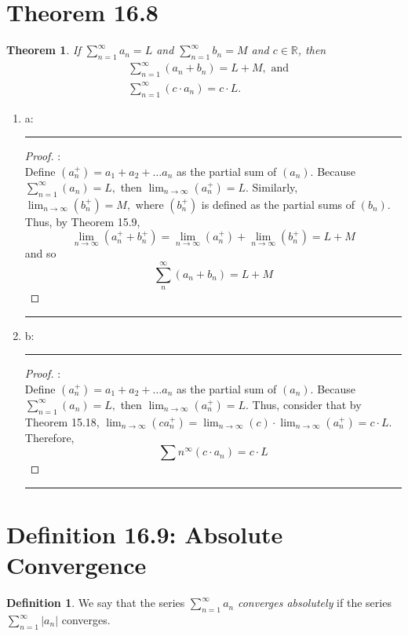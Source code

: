 \documentclass[openany, amssymb, psamsfonts]{amsart}
\newcommand{\bbR}{\mathbb{R}}
\newcommand{\abs}[1]{\lvert #1 \rvert}
\newtheorem{thm}{Theorem}[section]
\theoremstyle{definition}
\newtheorem{defn}{Definition}[section]
\numberwithin{equation}{section}
\begin{document}
\section*{Theorem 16.8}
\begin{thm}
\label{16.8}
	If $\sum\limits_{n = 1}^{\infty} a_n = L$ and $\sum\limits_{n = 1}^{\infty} b_n = M$ and $c \in \bbR$, then
	\begin{align*}
		&\sum_{n = 1}^{\infty}(a_n+b_n) = L+M, \text{ and} \\
		&\sum_{n = 1}^{\infty}(c\cdot a_n) = c\cdot L.
	\end{align*}
\end{thm}
\begin{enumerate}
    \item a:
\vspace{4pt}     \hrule   \vspace{4pt} \begin{proof}:\\
Define $(a_n^+) = a_1 + a_2 + \dots a_n$ as the partial sum of $(a_n).$ Because $\displaystyle\sum_{n=1}^\infty(a_n) = L,$ then $\lim_{n\to \infty}(a_n^+) = L.$ Similarly, $\lim_{n\to \infty}(b_n^+) = M,$ where $(b_n^+)$ is defined as the partial sums of $(b_n).$ Thus, by Theorem 15.9, \[\lim_{n\to \infty}(a_n^+ + b_n^+) = \lim_{n\to \infty}(a_n^+) + \lim_{n\to \infty}(b_n^+) = L+M\] and so \[\sum_{n}^\infty (a_n + b_n) = L+M\]
\end{proof}\vspace{4pt}     \hrule   \vspace{4pt}
    \item b:
\vspace{4pt}     \hrule   \vspace{4pt}\begin{proof}:\\
    Define $(a_n^+) = a_1 + a_2 + \dots a_n$ as the partial sum of $(a_n).$ Because $\displaystyle\sum_{n=1}^\infty(a_n) = L,$ then $\lim_{n\to \infty}(a_n^+) = L.$ Thus, consider that by Theorem 15.18, $\displaystyle\lim_{n\to \infty}(ca_n^+) = \displaystyle\lim_{n\to \infty}(c)\cdot \displaystyle\lim_{n\to \infty}(a_n^+) = c \cdot L.$ Therefore, \[\sum{n}^\infty(c\cdot a_n) = c\cdot L\]
\end{proof}\vspace{4pt}     \hrule   \vspace{4pt}
    
\end{enumerate}
\section*{Definition 16.9: Absolute Convergence}
\begin{defn} 
\label{16.9}
	We say that the series $\displaystyle\sum\limits_{n = 1}^{\infty} a_n$ \emph{converges absolutely} if the series $\displaystyle\sum\limits_{n = 1}^{\infty} \abs{a_n}$ converges.
\end{defn}
\end{document}

